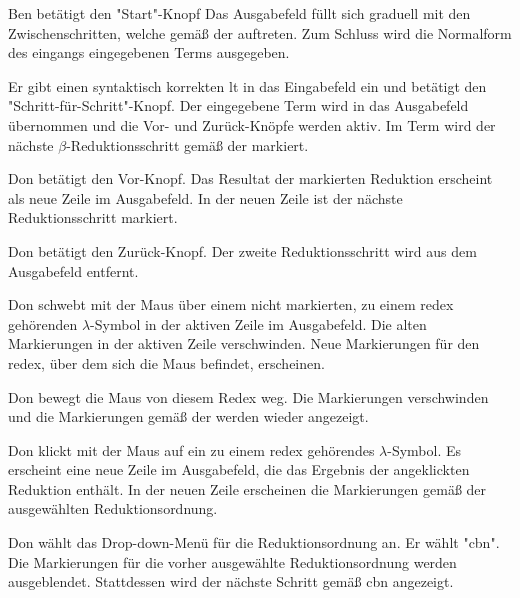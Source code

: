 \documentclass[parskip=full,11pt,twoside]{scrartcl}
\begin{document}
{Ben betätigt den "Start"-Knopf}
{Das Ausgabefeld füllt sich graduell mit den Zwischenschritten, welche gemäß der  auftreten.
Zum Schluss wird die Normalform des eingangs eingegebenen Terms ausgegeben.}


{Er gibt einen syntaktisch korrekten \gls{lt} in das Eingabefeld ein und betätigt
den "Schritt-für-Schritt"-Knopf.}
{Der eingegebene Term wird in das Ausgabefeld übernommen und die Vor- und
Zurück-Knöpfe werden aktiv. Im Term wird der nächste $\beta$-Reduktionsschritt
gemäß der  markiert.}

{Don betätigt den Vor-Knopf.}
{Das Resultat der markierten Reduktion erscheint als neue Zeile im Ausgabefeld.
In der neuen Zeile ist der nächste Reduktionsschritt markiert.}

{Don betätigt den Zurück-Knopf.}
{Der zweite Reduktionsschritt wird aus dem Ausgabefeld entfernt.}

{Don schwebt mit der Maus über einem nicht markierten, zu einem \gls{redex} gehörenden
$\lambda$-Symbol in der aktiven Zeile im Ausgabefeld.}
{Die alten Markierungen in der aktiven Zeile verschwinden. Neue Markierungen für den \gls{redex}, über dem
sich die Maus befindet, erscheinen.}

{Don bewegt die Maus von diesem Redex weg.}
{Die Markierungen verschwinden und die Markierungen gemäß der 
werden wieder angezeigt.}

{Don klickt mit der Maus auf ein zu einem \gls{redex} gehörendes $\lambda$-Symbol.}
{Es erscheint eine neue Zeile im Ausgabefeld, die das Ergebnis der angeklickten
Reduktion enthält. In der neuen Zeile erscheinen die Markierungen gemäß der ausgewählten
Reduktionsordnung.}

{Don wählt das Drop-down-Menü für die Reduktionsordnung an. Er wählt "\gls{cbn}".}
{Die Markierungen für die vorher ausgewählte Reduktionsordnung werden ausgeblendet.
Stattdessen wird der nächste Schritt gemäß \gls{cbn} angezeigt.}
\end{document}
